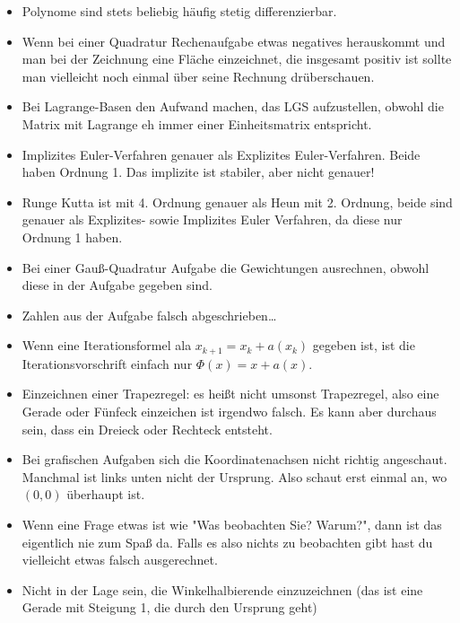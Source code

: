 \documentclass{scrartcl}
\begin{document}
\begin{itemize}
		\item Polynome sind stets beliebig häufig stetig differenzierbar.
		\item Wenn bei einer Quadratur Rechenaufgabe etwas negatives herauskommt und man bei der Zeichnung eine Fläche einzeichnet, die insgesamt positiv ist sollte man vielleicht noch einmal über seine Rechnung drüberschauen.
		\item Bei Lagrange-Basen den Aufwand machen, das LGS aufzustellen, obwohl die Matrix mit Lagrange eh immer einer Einheitsmatrix entspricht.
		\item Implizites Euler-Verfahren  genauer als Explizites Euler-Verfahren. Beide haben Ordnung 1. Das implizite ist stabiler, aber nicht genauer!
		\item Runge Kutta ist mit 4. Ordnung genauer als Heun mit 2. Ordnung, beide sind genauer als Explizites- sowie Implizites Euler Verfahren, da diese nur Ordnung 1 haben.
		\item Bei einer Gauß-Quadratur Aufgabe die Gewichtungen ausrechnen, obwohl diese in der Aufgabe gegeben sind.
		\item Zahlen aus der Aufgabe falsch abgeschrieben\dots
		\item Wenn eine Iterationsformel ala $x_{k+1} = x_k + a(x_k)$ gegeben ist, ist die Iterationsvorschrift einfach nur $\Phi(x) = x + a(x)$.
		\item Einzeichnen einer Trapezregel: es heißt nicht umsonst Trapezregel, also eine Gerade oder Fünfeck einzeichen ist irgendwo falsch. Es kann aber durchaus sein, dass ein Dreieck oder Rechteck entsteht.
		\item Bei grafischen Aufgaben sich die Koordinatenachsen nicht richtig angeschaut. Manchmal ist links unten nicht der Ursprung. Also schaut erst einmal an, wo $(0,0)$ überhaupt ist.
		\item Wenn eine Frage etwas ist wie "Was beobachten Sie? Warum?", dann ist das eigentlich nie zum Spaß da. Falls es also nichts zu beobachten gibt hast du vielleicht etwas falsch ausgerechnet.
		\item Nicht in der Lage sein, die Winkelhalbierende einzuzeichnen (das ist eine Gerade mit Steigung 1, die durch den Ursprung geht)
	\end{itemize}
	
\end{document}
